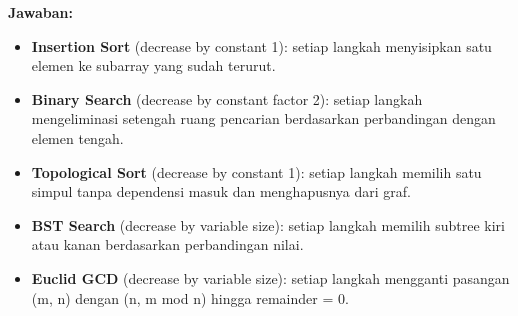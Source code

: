 \textbf{Jawaban:} 
\begin{itemize}
    \item \textbf{Insertion Sort} (decrease by constant 1): setiap langkah menyisipkan satu elemen ke subarray yang sudah terurut.
    \item \textbf{Binary Search} (decrease by constant factor 2): setiap langkah mengeliminasi setengah ruang pencarian berdasarkan perbandingan dengan elemen tengah.
    \item \textbf{Topological Sort} (decrease by constant 1): setiap langkah memilih satu simpul tanpa dependensi masuk dan menghapusnya dari graf.
    \item \textbf{BST Search} (decrease by variable size): setiap langkah memilih subtree kiri atau kanan berdasarkan perbandingan nilai.
    \item \textbf{Euclid GCD} (decrease by variable size): setiap langkah mengganti pasangan (m, n) dengan (n, m mod n) hingga remainder = 0.
\end{itemize}